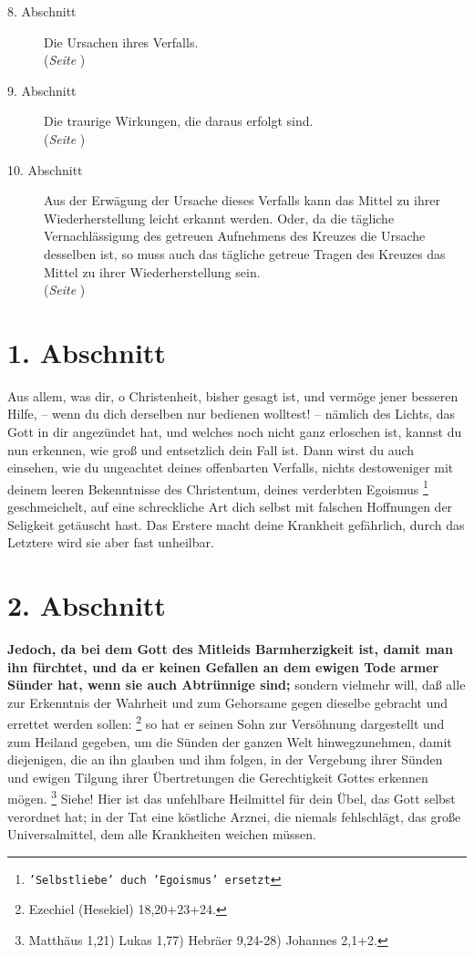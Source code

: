 \begin{description}
\item[8. Abschnitt] Die Ursachen ihres Verfalls.
\\(\textit{Seite \pageref{kap2_ab8}})
\item[9. Abschnitt] Die traurige Wirkungen, die daraus erfolgt sind.
\\(\textit{Seite \pageref{kap2_ab9}})
\item[10. Abschnitt] Aus der Erwägung der Ursache dieses Verfalls kann das
Mittel zu ihrer Wiederherstellung leicht erkannt werden. Oder, da die tägliche
Vernachlässigung des getreuen Aufnehmens des Kreuzes die Ursache desselben ist,
so muss auch das tägliche getreue Tragen des Kreuzes das Mittel zu ihrer
Wiederherstellung sein.
\\(\textit{Seite \pageref{kap2_ab10}})
\end{description}

\newpage 

\section{1. Abschnitt}  \label{kap2_ab1}

Aus allem, was dir, o Christenheit, bisher gesagt ist, und vermöge jener besseren
Hilfe, -- wenn du dich derselben nur bedienen wolltest! -- nämlich des Lichts,
das Gott in dir angezündet hat, und welches noch nicht ganz erloschen ist,
kannst du nun erkennen, wie groß und entsetzlich dein Fall ist. Dann wirst du
auch einsehen, wie du ungeachtet deines offenbarten Verfalls, nichts
destoweniger mit deinem leeren Bekenntnisse des Christentum, deines verderbten
Egoismus
\footnote{\texttt{'Selbstliebe' duch 'Egoismus' ersetzt}} geschmeichelt,
auf eine schreckliche Art dich selbst mit
falschen Hoffnungen der Seligkeit getäuscht hast. Das Erstere macht deine
Krankheit gefährlich, durch das Letztere wird sie aber fast unheilbar.

\section{2. Abschnitt}  \label{kap2_ab2}

\label{ref:02_02_kein_gefallen_am_tod} 
\textbf{Jedoch, da bei dem Gott des Mitleids Barmherzigkeit ist, damit man ihn
fürchtet, und da er keinen Gefallen an dem ewigen Tode  armer
Sünder hat, wenn
sie auch Abtrünnige sind;} sondern vielmehr will, daß alle zur Erkenntnis der
Wahrheit und zum Gehorsame gegen dieselbe gebracht und errettet werden
sollen:
\footnote{Ezechiel (Hesekiel) 18,20+23+24.}
 so hat er seinen Sohn zur
Versöhnung
dargestellt und zum Heiland gegeben, um die Sünden der ganzen Welt
hinwegzunehmen, damit diejenigen, die an ihn glauben und ihm folgen, in der
Vergebung ihrer Sünden und ewigen Tilgung ihrer Übertretungen die
Gerechtigkeit Gottes erkennen mögen.
\footnote{Matthäus 1,21) Lukas 1,77) Hebräer 9,24-28) Johannes 2,1+2.}
Siehe! Hier ist das unfehlbare Heilmittel für dein
Übel, das Gott selbst verordnet hat; in der Tat eine köstliche Arznei, die
niemals fehlschlägt, das große Universalmittel, dem alle Krankheiten weichen
müssen.


